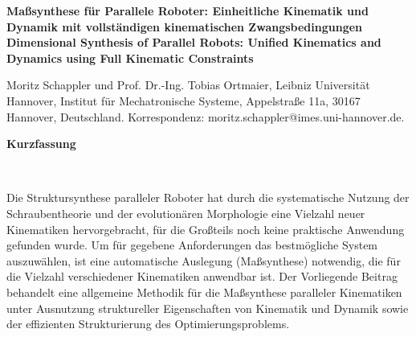\documentclass[fleqn,a4paper,10pt]{article}
\newenvironment{mytitle}{\fontsize{16pt}{1.0} \selectfont \bfseries}{\\}
\newenvironment*{myabstract}{\begin{Large}\bfseries}{\end{Large}\\[6pt]}%
\begin{document}
\begin{mytitle} 
Maßsynthese für Parallele Roboter: Einheitliche Kinematik und Dynamik mit vollständigen kinematischen Zwangsbedingungen \\[6pt] %
Dimensional Synthesis of Parallel Robots: Unified Kinematics and Dynamics using Full Kinematic Constraints
\end{mytitle}

Moritz Schappler und Prof. Dr.-Ing. Tobias Ortmaier, Leibniz Universität Hannover, Institut für Mechatronische Systeme, Appelstraße 11a, 30167 Hannover, Deutschland. Korrespondenz: moritz.schappler@imes.uni-hannover.de.

\vspace{24pt} %

\begin{myabstract} Kurzfassung \end{myabstract}

Die Struktursynthese paralleler Roboter hat durch die systematische Nutzung der Schraubentheorie \cite{KongGos2007} und der evolutionären Morphologie \cite{Gogu2008} eine Vielzahl neuer Kinematiken hervorgebracht, für die Großteils noch keine praktische Anwendung gefunden wurde.
Um für gegebene Anforderungen das bestmögliche System auszuwählen, ist eine automatische Auslegung (Maßsynthese) notwendig, die für die Vielzahl verschiedener Kinematiken anwendbar ist.
Der Vorliegende Beitrag behandelt eine allgemeine Methodik für die Maßsynthese paralleler Kinematiken unter Ausnutzung struktureller Eigenschaften von Kinematik und Dynamik sowie der effizienten Strukturierung des Optimierungsproblems.
\end{document}
